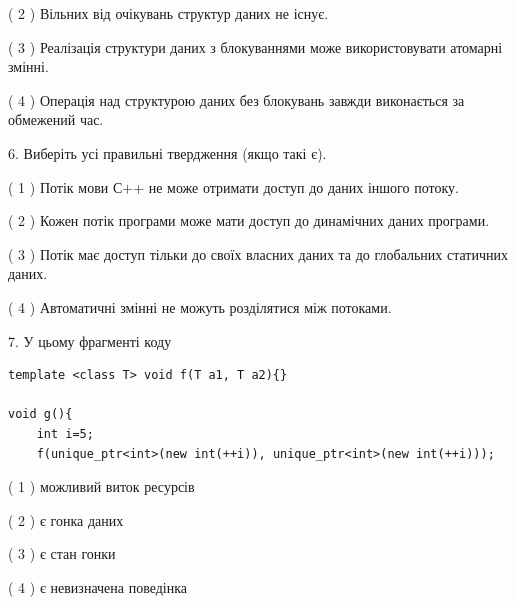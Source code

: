 \documentclass[12pt, ukrainian]{article}
\begin{document}
\begin {large}
{( 2 ) Вільних від очікувань структур даних не існує.%

( 3 ) Реалізація структури даних з блокуваннями може використовувати атомарні змінні.%

( 4 ) Операція над структурою даних без блокувань завжди виконається за обмежений час.%
\newpage



\vspace{5mm}
6. Виберіть усі правильні твердження (якщо такі є).\par
\vspace{2mm}

( 1 ) Потік мови С++ не може отримати доступ до даних іншого потоку.%

( 2 ) Кожен потік програми може мати доступ до динамічних даних програми.%

( 3 ) Потік має доступ тільки до своїх власних даних та до глобальних статичних даних.%

( 4 ) Автоматичні змінні не можуть розділятися між потоками.%


\vspace{5mm}
7. У цьому фрагменті коду
\begin{verbatim}
template <class T> void f(T a1, T a2){}

void g(){
    int i=5;
    f(unique_ptr<int>(new int(++i)), unique_ptr<int>(new int(++i)));
\end{verbatim}

( 1 ) можливий виток ресурсів%

( 2 ) є гонка даних%

( 3 ) є стан гонки%

( 4 ) є невизначена поведінка%
}
\end {large}
\end{document}
